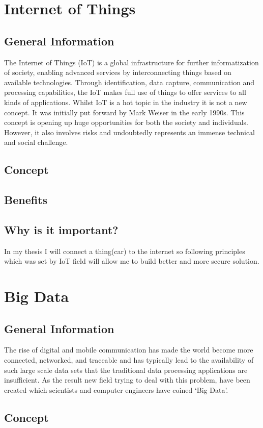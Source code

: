 \section{Internet of Things} 
\subsection{General Information}
The Internet of Things (IoT) is a global infrastructure for further informatization of society, enabling advanced services by interconnecting things based on available technologies. Through identification, data capture, communication and processing capabilities, the IoT makes full use of things to offer services to all kinds of applications. Whilst IoT is a hot topic in the industry it is not a new concept. It was initially put forward by Mark Weiser in the early 1990s. This concept is opening up huge opportunities for both the society and individuals. However, it also involves risks and undoubtedly represents an immense technical and social challenge.\
\subsection{Concept}
\subsection{Benefits}
\subsection{Why is it important?}
In my thesis I will connect a thing(car) to the internet so following principles which was set by IoT field will allow me to build better and more secure solution.
\section{Big Data}
\subsection{General Information}
The rise of digital and mobile communication has made the world become more connected, networked, and traceable and has typically lead to the availability of such large scale data sets that the traditional data processing applications are insufficient. As the result new field trying to deal with this problem, have been created which scientists and computer engineers have coined `Big Data'.
\subsection{Concept}

